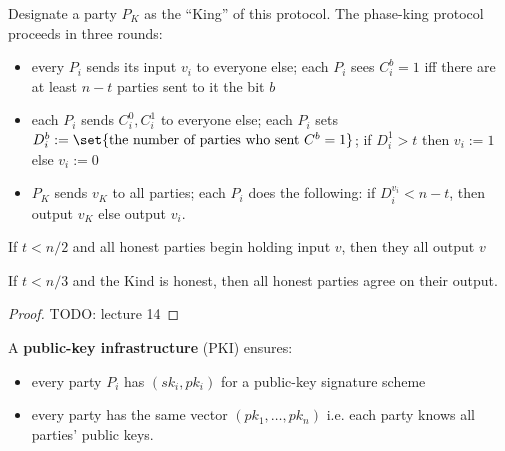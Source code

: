 \begin{prcl}
Designate a party $P_K$ as the ``King'' of this protocol.
The phase-king protocol proceeds in three rounds:
\begin{itemize}
\item 
every $P_i$ sends its input $v_i$ to everyone else;
each $P_i$ sees $C_i^b = 1$ iff there are at least $n - t$ parties sent to it the bit $b$
\item 
each $P_i$ sends $C_i^0, C_i^1$ to everyone else;
each $P_i$ sets $D_i^b := \set{\text{the number of parties who sent}~C^b = 1}$;
if $D_i^1 > t$ then $v_i := 1$ else $v_i := 0$
\item $P_K$ sends $v_K$ to all parties;
each $P_i$ does the following: if $D_i^{v_i} < n - t$, then output $v_K$ else output $v_i$.
\end{itemize}
\end{prcl}

\begin{lem}
If $t < n/2$ and all honest parties begin holding input $v$, then they all output $v$
\end{lem}

\begin{lem}
If $t < n/3$ and the Kind is honest, then all honest parties agree on their output.
\end{lem}

\begin{proof}
TODO: lecture 14
\end{proof}

\begin{defn}
A \textbf{public-key infrastructure} (PKI) ensures:
\begin{itemize}
\item every party $P_i$ has $(sk_i, pk_i)$ for a public-key signature scheme
\item every party has the same vector $(pk_1, \dots, pk_n)$ i.e. each party knows all parties' public keys.
\end{itemize}
\end{defn}

